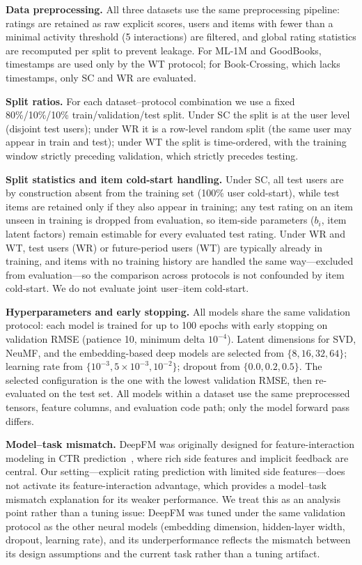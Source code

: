 \documentclass[journal]{IEEEtran}
\begin{document}
\textbf{Data preprocessing.} All three datasets use the same preprocessing pipeline: ratings are retained as raw explicit scores, users and items with fewer than a minimal activity threshold (5 interactions) are filtered, and global rating statistics are recomputed per split to prevent leakage. For ML-1M and GoodBooks, timestamps are used only by the WT protocol; for Book-Crossing, which lacks timestamps, only SC and WR are evaluated.

\textbf{Split ratios.} For each dataset--protocol combination we use a fixed 80\%/10\%/10\% train/validation/test split. Under SC the split is at the user level (disjoint test users); under WR it is a row-level random split (the same user may appear in train and test); under WT the split is time-ordered, with the training window strictly preceding validation, which strictly precedes testing.

\textbf{Split statistics and item cold-start handling.} Under SC, all test users are by construction absent from the training set (100\% user cold-start), while test items are retained only if they also appear in training; any test rating on an item unseen in training is dropped from evaluation, so item-side parameters ($b_i$, item latent factors) remain estimable for every evaluated test rating. Under WR and WT, test users (WR) or future-period users (WT) are typically already in training, and items with no training history are handled the same way---excluded from evaluation---so the comparison across protocols is not confounded by item cold-start. We do not evaluate joint user--item cold-start.

\textbf{Hyperparameters and early stopping.} All models share the same validation protocol: each model is trained for up to 100 epochs with early stopping on validation RMSE (patience 10, minimum delta $10^{-4}$). Latent dimensions for SVD, NeuMF, and the embedding-based deep models are selected from $\{8, 16, 32, 64\}$; learning rate from $\{10^{-3}, 5\!\times\!10^{-3}, 10^{-2}\}$; dropout from $\{0.0, 0.2, 0.5\}$. The selected configuration is the one with the lowest validation RMSE, then re-evaluated on the test set. All models within a dataset use the same preprocessed tensors, feature columns, and evaluation code path; only the model forward pass differs.

\textbf{Model--task mismatch.} DeepFM was originally designed for feature-interaction modeling in CTR prediction~\cite{guo2017deepfm}, where rich side features and implicit feedback are central. Our setting---explicit rating prediction with limited side features---does not activate its feature-interaction advantage, which provides a model--task mismatch explanation for its weaker performance. We treat this as an analysis point rather than a tuning issue: DeepFM was tuned under the same validation protocol as the other neural models (embedding dimension, hidden-layer width, dropout, learning rate), and its underperformance reflects the mismatch between its design assumptions and the current task rather than a tuning artifact.
\end{document}
